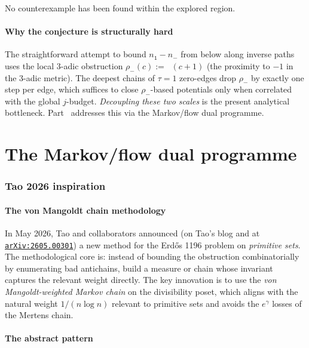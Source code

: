 \documentclass[11pt,a4paper]{article}
\theoremstyle{plain}
\theoremstyle{definition}
\newcommand{\numOnes}{n_{\mathtt{1}}}
\newcommand{\numNeg}{n_{\!-}}
\DeclareMathOperator{\nuthree}{\nu_3}
\begin{document}
No counterexample has been found within the explored region.

\subsection{Why the conjecture is structurally hard}

The straightforward attempt to bound $\numOnes - \numNeg$ from below
along inverse paths uses the local 3-adic obstruction
$\rho_-(c) := \nuthree(c + 1)$ (the proximity to $-1$ in the 3-adic
metric). The deepest chains of $\tau = 1$ zero-edges drop
$\rho_-$ by exactly one step per edge, which suffices to close
$\rho_-$-based potentials only when correlated with the global
$j$-budget. \emph{Decoupling these two scales} is the present
analytical bottleneck. Part~\ref{part:markov} addresses this via the
Markov/flow dual programme.

\part{The Markov/flow dual programme}\label{part:markov}

\section{Tao 2026 inspiration}\label{sec:tao-inspiration}

\subsection{The von Mangoldt chain methodology}

In May 2026, Tao and collaborators announced (on Tao's blog and at
\href{https://arxiv.org/abs/2605.00301}{\texttt{arXiv:2605.00301}})
a new method for the Erdős 1196 problem on \emph{primitive sets}.
The methodological core is: instead of bounding the obstruction
combinatorially by enumerating bad antichains, build a measure or
chain whose invariant captures the relevant weight directly. The
key innovation is to use the
\emph{von Mangoldt-weighted Markov chain} on the divisibility poset,
which aligns with the natural weight $1/(n \log n)$ relevant to
primitive sets and avoids the $e^\gamma$ losses of the Mertens
chain.

\subsection{The abstract pattern}
\end{document}
